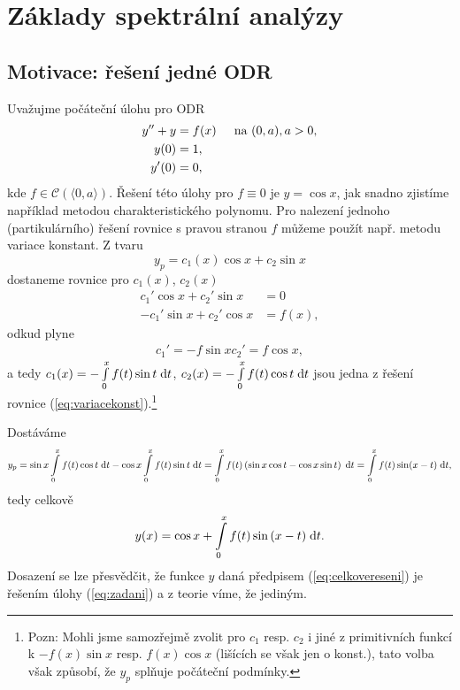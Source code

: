 \section{Základy spektrální analýzy}

\subsection{Motivace: řešení jedné ODR}
\Priklad 

Uvažujme počáteční úlohu pro ODR
\begin{equation}
    \begin{split}
        y''+y&=f(x) \text{\;\;\;\; na } (0,a), a>0,\\
        y(0)&=1,\\
        y'(0)&=0,
    \end{split}
    \label{eq:zadani}
\end{equation}
kde $f\in \mathcal{C}( \langle 0, a \rangle )$. Řešení této úlohy pro $f\equiv 0$ je $y=\cos x$, jak snadno zjistíme například metodou charakteristického polynomu. Pro nalezení jednoho (partikulárního) řešení rovnice s pravou stranou $f$ můžeme použít např. metodu variace konstant. Z tvaru
\begin{equation}
    y_p=c_1(x) \cos x+c_2 \sin x
\end{equation}
dostaneme rovnice pro $c_1(x)$, $c_2(x)$
\begin{equation}
    \begin{split}
        c_1'\cos x+c_2'\sin x&=0\\
        -c_1'\sin x+c_2'\cos x&=f(x),
    \end{split}
    \label{eq:variacekonst}
\end{equation}
odkud plyne
\begin{equation}
    \begin{split}
        c_1'=-f \sin x
        c_2'=f\cos x,
    \end{split}
\end{equation}
a tedy $ c_1(x) = -\int\limits_0^xf(t)\sin t \;\mathrm{d}t$, $ c_2(x) = -\int\limits_0^xf(t)\cos t \;\mathrm{d}t$ jsou jedna z řešení rovnice (\ref{eq:variacekonst}).\footnote{Pozn: Mohli jsme samozřejmě zvolit pro $c_1$ resp. $c_2$ i jiné z primitivních funkcí k $-f(x)\sin x$ resp. $f(x) \cos x$ (lišících se však jen o konst.), tato volba však způsobí, že $y_p$ splňuje počáteční podmínky.}

Dostáváme
\begin{equation}
        y_p=\sin x \int\limits_0^xf(t)\cos t\;\mathrm{d}t-\cos x\int\limits_0^x f(t)\sin t\;\mathrm{d}t=\int\limits_0^x f(t)\left(\sin x \cos t-\cos x\sin t\right) \;\mathrm{d}t= \int\limits_0^xf(t) \sin(x-t)\;\mathrm{d}t,
\end{equation}
tedy celkově
\begin{equation}
    y(x)=\cos x+\int\limits_0^x f(t)\sin{(x-t)}\;\mathrm{d}t.
    \label{eq:celkovereseni}
\end{equation}
Dosazení se lze přesvědčit, že funkce $y$ daná předpisem (\ref{eq:celkovereseni}) je řešením úlohy (\ref{eq:zadani}) a z teorie víme, že jediným.

